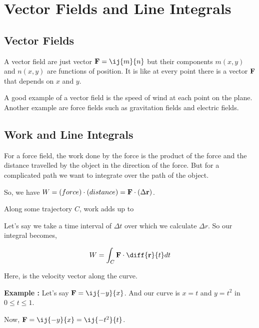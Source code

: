 

\chapter{Vector Fields and Line Integrals}

\bigbreak

\section{Vector Fields}

A vector field are just vector ${\bf F} = \ij{m}{n}$ but their components $m(x, y)$ and $n(x, y)$ are functions of position.
It is like at every point there is a vector ${\bf F}$ that depends on $x$ and $y$.

A good example of a vector field is the speed of wind at each point on the plane.
Another example are force fields such as gravitation fields and electric fields.

\section{Work and Line Integrals}

For a force field, the work done by the force is the product of the force and the distance travelled by the object in the direction of the force.
But for a complicated path we want to integrate over the path of the object.

So, we have $W = (force)\cdot(distance) = {\bf F} \cdot (\Delta {\bf r})$.

Along some trajectory $C$, work adds up to 

Let's say we take a time interval of $\Delta t$ over which we calculate $\Delta r$. So our integral becomes, 

$$ W = \int_C {\bf F} \cdot \diff{{\bf r}}{t} dt $$

Here,  is the velocity vector along the curve.

\bigbreak

{\bf Example : } Let's say ${\bf F} = \ij{-y}{x}$. And our curve is $x = t$ and $y = t^2$ in $0 \leq t \leq 1$.

Now, ${\bf F} = \ij{-y}{x} = \ij{-t^2}{t}$.

